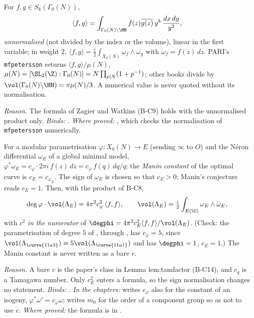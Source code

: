 \begin{convention}\label{conv:notation:bc8}
For $f,g\in S_k(\Gamma_0(N))$,
\[
\langle f,g\rangle=\int_{\Gamma_0(N)\backslash\HH}f(z)\overline{g(z)}\,y^k\,\frac{dx\,dy}{y^2},
\]
\emph{unnormalised} (not divided by the index or the volume), linear in the first variable; in weight $2$,
$\langle f,g\rangle=\frac i2\int_{X_0(N)}\omega_f\wedge\overline{\omega_g}$ with $\omega_f=f(z)\,dz$. PARI's \texttt{mfpetersson} returns
$\langle f,g\rangle/\mu(N)$, $\mu(N)=[\SL_2(\Z):\Gamma_0(N)]=N\prod_{p\mid N}(1+p^{-1})$; other books divide by
$\vol(\Gamma_0(N)\backslash\HH)=\pi\mu(N)/3$. A numerical value is never quoted without its normalisation.
\end{convention}

\noindent\emph{Reason.} The formula of Zagier and Watkins (B-C9) holds with the unnormalised product only.
\emph{Binds:} . \emph{Where proved:}
, which checks the normalisation of \texttt{mfpetersson} numerically.

\begin{convention}\label{conv:notation:bc9}
For a modular parametrisation $\varphi\colon X_0(N)\to E$ (sending $\infty$ to $O$) and the N\'eron differential $\omega_E$ of a global
minimal model, $\varphi^*\omega_E=c_\varphi\cdot2\pi i\,f(z)\,dz=c_\varphi\,f(q)\,dq/q$; the \emph{Manin constant} of the optimal curve is
$c_E=c_{\varphi_E}$. The sign of $\omega_E$ is chosen so that $c_E>0$; Manin's conjecture reads $c_E=1$. Then, with the product of B-C8,
\[
\deg\varphi\cdot\vol(\Lambda_E)=4\pi^2c_\varphi^2\,\langle f,f\rangle,\qquad\vol(\Lambda_E)=\tfrac i2\int_{E(\C)}\omega_E\wedge\bar\omega_E,
\]
with $c^2$ \emph{in the numerator} of $\degphi=4\pi^2c_E^2\langle f,f\rangle/\vol(\Lambda_E)$. (Check: the parametrisation of degree $5$ of
, through , has $c_\varphi=5$, since $\vol(\Lambda_{\curve{11a3}})=5\vol(\Lambda_{\curve{11a1}})$ and  has $\degphi=1$, $c_E=1$.) The Manin constant is
never written as a bare $c$.
\end{convention}

\noindent\emph{Reason.} A bare $c$ is the paper's class in Lemma lem:tamfactor (B-C14), and $c_q$ is a Tamagawa number. Only
$c_E^2$ enters a formula, so the sign normalisation changes no statement. \emph{Binds:}
. \emph{In the chapters:}
 writes $c_\varphi$ also for the constant of an isogeny, $\varphi^*\omega'=c_\varphi\omega$;  writes
$m_0$ for the order of a component group so as not to use $c$. \emph{Where proved:} the formula is in .


